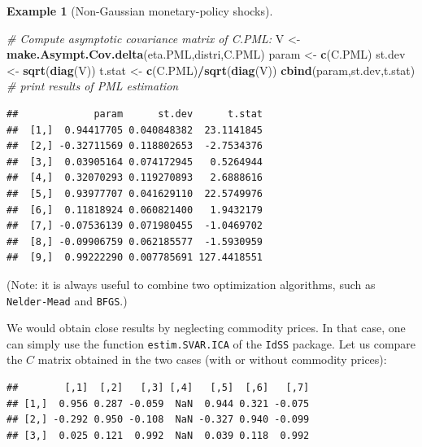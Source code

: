 \documentclass[
  11pt,
]{book}
\newenvironment{Shaded}{\begin{snugshade}}{\end{snugshade}}
\newcommand{\AttributeTok}[1]{\textcolor[rgb]{0.13,0.29,0.53}{#1}}
\newcommand{\CommentTok}[1]{\textcolor[rgb]{0.56,0.35,0.01}{\textit{#1}}}
\newcommand{\ConstantTok}[1]{\textcolor[rgb]{0.56,0.35,0.01}{#1}}
\newcommand{\DecValTok}[1]{\textcolor[rgb]{0.00,0.00,0.81}{#1}}
\newcommand{\FunctionTok}[1]{\textcolor[rgb]{0.13,0.29,0.53}{\textbf{#1}}}
\newcommand{\NormalTok}[1]{#1}
\newcommand{\OtherTok}[1]{\textcolor[rgb]{0.56,0.35,0.01}{#1}}
\newcommand{\SpecialCharTok}[1]{\textcolor[rgb]{0.81,0.36,0.00}{\textbf{#1}}}
\theoremstyle{definition}
\theoremstyle{definition}
\newtheorem{example}{Example}[chapter]
\theoremstyle{definition}
\theoremstyle{definition}
\theoremstyle{remark}
\begin{document}
\begin{example}[Non-Gaussian monetary-policy shocks]
\begin{Shaded}
\begin{Highlighting}[]
\CommentTok{\# Compute asymptotic covariance matrix of C.PML:}
\NormalTok{V }\OtherTok{\textless{}{-}} \FunctionTok{make.Asympt.Cov.delta}\NormalTok{(eta.PML,distri,C.PML)}
\NormalTok{param }\OtherTok{\textless{}{-}} \FunctionTok{c}\NormalTok{(C.PML)}
\NormalTok{st.dev }\OtherTok{\textless{}{-}} \FunctionTok{sqrt}\NormalTok{(}\FunctionTok{diag}\NormalTok{(V))}
\NormalTok{t.stat }\OtherTok{\textless{}{-}} \FunctionTok{c}\NormalTok{(C.PML)}\SpecialCharTok{/}\FunctionTok{sqrt}\NormalTok{(}\FunctionTok{diag}\NormalTok{(V))}
\FunctionTok{cbind}\NormalTok{(param,st.dev,t.stat) }\CommentTok{\# print results of PML estimation}
\end{Highlighting}
\end{Shaded}

\begin{verbatim}
##             param      st.dev      t.stat
##  [1,]  0.94417705 0.040848382  23.1141845
##  [2,] -0.32711569 0.118802653  -2.7534376
##  [3,]  0.03905164 0.074172945   0.5264944
##  [4,]  0.32070293 0.119270893   2.6888616
##  [5,]  0.93977707 0.041629110  22.5749976
##  [6,]  0.11818924 0.060821400   1.9432179
##  [7,] -0.07536139 0.071980455  -1.0469702
##  [8,] -0.09906759 0.062185577  -1.5930959
##  [9,]  0.99222290 0.007785691 127.4418551
\end{verbatim}

(Note: it is always useful to combine two optimization algorithms, such as \texttt{Nelder-Mead} and \texttt{BFGS}.)

We would obtain close results by neglecting commodity prices. In that case, one can simply use the function \texttt{estim.SVAR.ICA} of the \texttt{IdSS} package. Let us compare the \(C\) matrix obtained in the two cases (with or without commodity prices):

\begin{Shaded}
\end{Shaded}

\begin{verbatim}
##        [,1]  [,2]   [,3] [,4]   [,5]  [,6]   [,7]
## [1,]  0.956 0.287 -0.059  NaN  0.944 0.321 -0.075
## [2,] -0.292 0.950 -0.108  NaN -0.327 0.940 -0.099
## [3,]  0.025 0.121  0.992  NaN  0.039 0.118  0.992
\end{verbatim}


\end{example}
\end{document}
